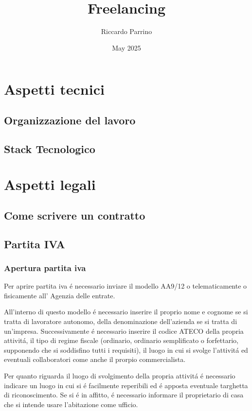 \documentclass{article}
\title{Freelancing}
\author{Riccardo Parrino}
\date{May 2025}
\begin{document}
\maketitle

\section{Aspetti tecnici}
\subsection{Organizzazione del lavoro}
\subsection{Stack Tecnologico}

\section{Aspetti legali}

\subsection{Come scrivere un contratto}
\subsection{Partita IVA}
\subsubsection{Apertura partita iva}
Per aprire partita iva \'e necessario inviare il modello AA9/12 o telematicamente o fisicamente all' Agenzia delle entrate. 

All'interno di questo modello \'e necessario inserire il proprio nome e cognome se si tratta di lavoratore autonomo, della denominazione dell'azienda se si tratta di un'impresa. Successivamente \'e necessario inserire il codice ATECO della propria attivit\'a, il tipo di regime fiscale (ordinario, ordinario semplificato o forfettario, supponendo che si soddisfino tutti i requisiti), il luogo in cui si svolge l'attivit\'a ed eventuali collaboratori come anche il prorpio commercialista.

Per quanto riguarda il luogo di svolgimento della propria attivit\'a \'e necessario indicare un luogo in cui si \'e facilmente reperibili ed \'e apposta eventuale targhetta di riconoscimento. Se si \'e in affitto, \'e necessario informare il proprietario di casa che si intende usare l'abitazione come ufficio.
\end{document}
